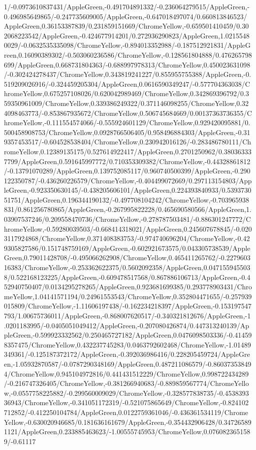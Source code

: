 {\begin{tikzternal}
1/-0.0973610837431/AppleGreen,-0.491704891332/-0.236064279515/AppleGreen,-0.496985649865/-0.247735609005/AppleGreen,-0.647018497074/0.660813846523/AppleGreen,0.36153387839/0.231859151669/ChromeYellow,-0.659501410459/0.302068223542/AppleGreen,-0.424677914201/0.272936290823/AppleGreen,1.02155480029/-0.0632535335098/ChromeYellow,-0.894013352988/-0.187512921831/AppleGreen,0.16090389302/-0.503060236586/ChromeYellow,-0.128561804888/0.476265798699/AppleGreen,0.668731804363/-0.688997978313/ChromeYellow,0.450023631098/-0.302424278437/ChromeYellow,0.343819241227/0.855955755388/AppleGreen,-0.519209026916/-0.324459205304/AppleGreen,0.0616590349247/-0.577704363038/ChromeYellow,0.675257108026/0.620042989469/ChromeYellow,0.342869396792/0.359350961009/ChromeYellow,0.339386249322/0.371146098255/ChromeYellow,0.324098463773/-0.853867935672/ChromeYellow,0.506745684669/0.00137363736355/ChromeYellow,-0.111554574066/-0.555924601129/ChromeYellow,0.929420095881/0.500458908753/ChromeYellow,0.0928766506405/0.958496884303/AppleGreen,-0.319357453517/-0.604528538404/ChromeYellow,0.230942016126/-0.283486780111/ChromeYellow,0.12389135175/0.527614922417/AppleGreen,0.2701250962/0.380363337799/AppleGreen,0.591645997772/0.710353309382/ChromeYellow,-0.44328861812/-0.13791070289/AppleGreen,0.139752085117/0.960740500399/AppleGreen,-0.290122350787/-0.436260226579/ChromeYellow,-0.404499072669/0.297113154803/AppleGreen,-0.923350630145/-0.438205606101/AppleGreen,0.224393840933/0.539373051751/AppleGreen,0.196344190132/-0.497708104242/ChromeYellow,-0.703965938831/0.861256780865/AppleGreen,-0.267995822228/0.465690580566/AppleGreen,1.03907537246/0.209558470736/ChromeYellow,-0.278787503481/-0.886301247772/ChromeYellow,-0.59280039503/-0.668414318021/AppleGreen,0.245607678845/-0.0203117924868/ChromeYellow,0.371408383753/-0.974740696204/ChromeYellow,-0.429305827586/0.151748759169/AppleGreen,-0.602921673575/0.043305738539/AppleGreen,0.79011428708/-0.495066262908/ChromeYellow,0.465411265762/-0.227960316383/ChromeYellow,-0.253362622375/0.5602092358/AppleGreen,0.0471559455038/0.522168123225/AppleGreen,-0.609478517568/0.867886106713/AppleGreen,-0.452940750407/0.0134295278265/AppleGreen,0.923681699385/0.293778903431/ChromeYellow,1.04141571194/0.24961553543/ChromeYellow,0.352804471655/-0.257939015809/ChromeYellow,-1.11606197438/-0.162234218397/AppleGreen,-0.153197547793/1.00675736011/AppleGreen,-0.868007620517/-0.340321812676/AppleGreen,-1.0201183995/-0.0405051049412/AppleGreen,-0.207080426874/0.447313240139/AppleGreen,-0.599923332562/0.250465727182/AppleGreen,0.0476098503336/-0.414598357475/ChromeYellow,0.432237745283/0.0463792602468/ChromeYellow,-1.01489349361/-0.125187372172/AppleGreen,-0.392036986416/0.228205459724/AppleGreen,-1.05932870587/-0.0787290348169/AppleGreen,0.487211086579/-0.860373538494/ChromeYellow,0.945104972816/0.441431512229/ChromeYellow,0.998722434289/-0.216747326405/ChromeYellow,-0.381266940683/-0.889859567774/ChromeYellow,-0.0557758225882/-0.299560009029/ChromeYellow,-0.328577838735/-0.453839336943/ChromeYellow,-0.341051172319/-0.521075865649/ChromeYellow,-0.824102712852/-0.412250104784/AppleGreen,0.0122759361046/-0.436361534119/ChromeYellow,-0.630020946685/0.181636161679/AppleGreen,-0.354432906428/0.347265891121/AppleGreen,0.233885463623/-1.00555745953/ChromeYellow,0.0760823651589/-0.61117
\end{tikzternal}}
